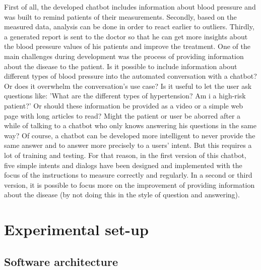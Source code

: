 First of all, the developed chatbot includes information about blood pressure and was built to remind patients of their measurements. Secondly, based on the measured data, analysis can be done in order to react earlier to outliers. Thirdly, a generated report is sent to the doctor so that he can get more insights about the blood pressure values of his patients and improve the treatment.
One of the main challenges during development was the process of providing information about the disease to the patient. Is it possible to include information about different types of blood pressure into the automated conversation with a chatbot? Or does it overwhelm the conversation's use case? Is it useful to let the user ask questions like: 'What are the different types of hypertension? Am i a high-risk patient?' 
Or should these information be provided as a video or a simple web page with long articles to read? Might the patient or user be aborred after a while of talking to a chatbot who only knows answering his questions in the same way?
Of course, a chatbot can be developed more intelligent to never provide the same answer and to answer more precisely to a users' intent. But this requires a lot of training and testing. 
For that reason, in the first version of this chatbot, five simple intents and dialogs have been designed and implemented with the focus of the instructions to measure correctly and regularly. 
In a second or third version, it is possible to focus more on the improvement of providing information about the disease (by not doing this in the style of question and answering).

\section{Experimental set-up}

\subsection{Software architecture}

